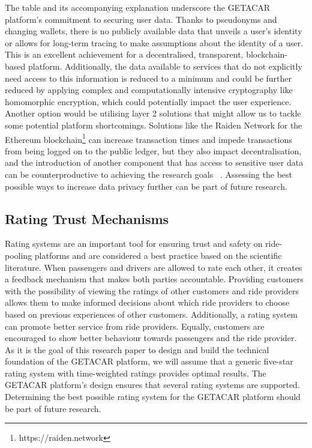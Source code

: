 The table and its accompanying explanation underscore the GETACAR platform's commitment to securing user data. Thanks to pseudonyms and changing wallets, there is no publicly available data that unveils a user's identity or allows for long-term tracing to make assumptions about the identity of a user. This is an excellent achievement for a decentralised, transparent, blockchain-based platform.  Additionally, the data available to services that do not explicitly need access to this information is reduced to a minimum and could be further reduced by applying complex and computationally intensive cryptography like homomorphic encryption, which could potentially impact the user experience. Another option would be utilising layer 2 solutions that might allow us to tackle some potential platform shortcomings. Solutions like the Raiden Network for the Ethereum blockchain\footnote{https://raiden.network} can increase transaction times and impede transactions from being logged on to the public ledger, but they also impact decentralisation, and the introduction of another component that has access to sensitive user data can be counterproductive to achieving the research goals ~\cite{10018958}. Assessing the best possible ways to increase data privacy further can be part of future research. 




\subsection{Rating Trust Mechanisms}\label{subsec:RatingTrustMechanisms}
Rating systems are an important tool for ensuring trust and safety on ride-pooling platforms and are considered a best practice based on the scientific literature. When passengers and drivers are allowed to rate each other, it creates a feedback mechanism that makes both parties accountable. Providing customers with the possibility of viewing the ratings of other customers and ride providers allows them to make informed decisions about which ride providers to choose based on previous experiences of other customers. Additionally, a rating system can promote better service from ride providers. Equally, customers are encouraged to show better behaviour towards passengers and the ride provider. As it is the goal of this research paper to design and build the technical foundation of the GETACAR platform, we will assume that a generic five-star rating system with time-weighted ratings provides optimal results. The GETACAR platform's design ensures that several rating systems are supported. Determining the best possible rating system for the GETACAR platform should be part of future research. 


